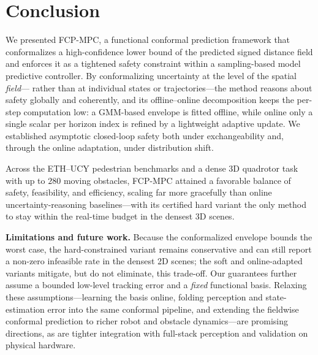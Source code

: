 \documentclass[lettersize,journal]{IEEEtran}
\begin{document}
\section{Conclusion}

We presented FCP-MPC, a functional conformal prediction framework that conformalizes
a high-confidence lower bound of the predicted signed distance field and enforces
it as a tightened safety constraint within a sampling-based model predictive
controller. By conformalizing uncertainty at the level of the spatial \emph{field}---
rather than at individual states or trajectories---the method reasons about safety
globally and coherently, and its offline--online decomposition keeps the per-step
computation low: a GMM-based envelope is fitted offline, while online only a
single scalar per horizon index is refined by a lightweight adaptive update. We
established asymptotic closed-loop safety both under exchangeability and, through
the online adaptation, under distribution shift.

Across the ETH--UCY pedestrian benchmarks and a dense 3D quadrotor task with up to
$280$ moving obstacles, FCP-MPC attained a favorable balance of safety,
feasibility, and efficiency, scaling far more gracefully than online
uncertainty-reasoning baselines---with its certified hard variant the only method to
stay within the real-time budget in the densest 3D scenes.

\noindent
{\bf Limitations and future work.}
Because the conformalized envelope bounds the worst case, the hard-constrained variant
remains conservative and can still report a non-zero infeasible rate in the densest
2D scenes; the soft and online-adapted variants mitigate, but do not eliminate, this
trade-off. Our guarantees further assume a bounded low-level tracking error and a
\emph{fixed} functional basis. Relaxing these assumptions---learning the basis
online, folding perception and state-estimation error into the same conformal
pipeline, and extending the fieldwise conformal prediction to richer robot and obstacle
dynamics---are promising directions, as are tighter integration with full-stack
perception and validation on physical hardware.
\end{document}
